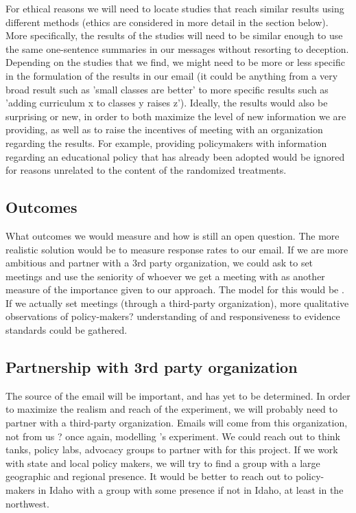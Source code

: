 \documentclass[12pt,final,fleqn]{article}
\theoremstyle{plain}
\begin{document}
For ethical reasons we will need to locate studies that reach similar results using different methods (ethics are considered in more detail in the  section below). More specifically, the results of the studies will need to be similar enough to use the same one-sentence summaries in our messages without resorting to deception. Depending on the studies that we find, we might need to be more or less specific in the formulation of the results in our email (it could be anything from a very broad result such as 'small classes are better' to more specific results such as 'adding curriculum x to classes y raises z'). Ideally, the results would also be surprising or new, in order to both maximize the level of new information we are providing, as well as to raise the incentives of meeting with an organization regarding the results. For example, providing policymakers with information regarding an educational policy that has already been adopted would be ignored for reasons unrelated to the content of the randomized treatments. 

\subsection{Outcomes} \label{sec: Outcomes}
What outcomes we would measure and how is still an open question. The more realistic solution would be to measure response rates to our email. If we are more ambitious and partner with a 3rd party organization, we could ask to set meetings and use the seniority of whoever we get a meeting with as another measure of the importance given to our approach. The model for this would be \citet{kalla2016campaign}. If we actually set meetings (through a third-party organization), more qualitative observations of policy-makers? understanding of and responsiveness to evidence standards could be gathered. 

\subsection{Partnership with 3rd party organization} \label{sec: Partnership}

The source of the email will be important, and has yet to be determined. In order to maximize the realism and reach of the experiment, we will probably need to partner with a third-party organization. Emails will come from this organization, not from us ? once again, modelling \citet{kalla2016campaign}'s experiment. We could reach out to think tanks, policy labs, advocacy groups to partner with for this project. If we work with state and local policy makers, we will try to find a group with a large geographic and regional presence. It would be better to reach out to policy-makers in Idaho with a group with some presence if not in Idaho, at least in the northwest. 
\end{document}
